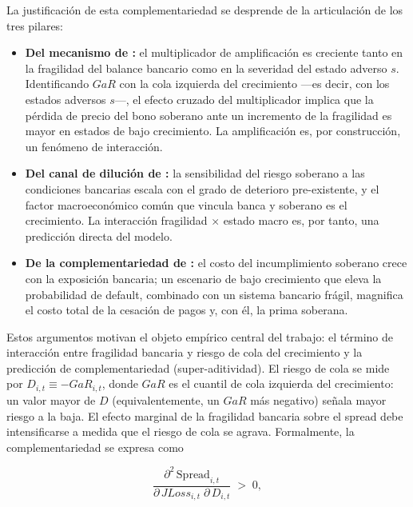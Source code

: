 La justificación de esta complementariedad se desprende de la articulación de los tres pilares:

\begin{itemize}
    \item \textbf{Del mecanismo de \citet{FarhiTirole2018b}:} el multiplicador de amplificación es creciente tanto en la fragilidad del balance bancario como en la severidad del estado adverso $s$. Identificando $GaR$ con la cola izquierda del crecimiento —es decir, con los estados adversos $s$—, el efecto cruzado del multiplicador implica que la pérdida de precio del bono soberano ante un incremento de la fragilidad es mayor en estados de bajo crecimiento. La amplificación es, por construcción, un fenómeno de interacción.
    \item \textbf{Del canal de dilución de \citet{AcharyaDrechslerSchnabl2014b}:} la sensibilidad del riesgo soberano a las condiciones bancarias escala con el grado de deterioro pre-existente, y el factor macroeconómico común que vincula banca y soberano es el crecimiento. La interacción fragilidad $\times$ estado macro es, por tanto, una predicción directa del modelo.
    \item \textbf{De la complementariedad de \citet{GennaioliMartinRossi2014}:} el costo del incumplimiento soberano crece con la exposición bancaria; un escenario de bajo crecimiento que eleva la probabilidad de default, combinado con un sistema bancario frágil, magnifica el costo total de la cesación de pagos y, con él, la prima soberana.
\end{itemize}

Estos argumentos motivan el objeto empírico central del trabajo: el término de interacción entre fragilidad bancaria y riesgo de cola del crecimiento y la predicción de complementariedad (super-aditividad). El riesgo de cola se mide por $D_{i,t}\equiv-GaR_{i,t}$, donde $GaR$ es el cuantil de cola izquierda del crecimiento: un valor mayor de $D$ (equivalentemente, un $GaR$ más negativo) señala mayor riesgo a la baja. El efecto marginal de la fragilidad bancaria sobre el spread debe intensificarse a medida que el riesgo de cola se agrava. Formalmente, la complementariedad se expresa como

\[ \frac{\partial^{2}\, \mathrm{Spread}_{i,t}}{\partial\, JLoss_{i,t}\;\partial\, D_{i,t}} \;>\; 0, \]

